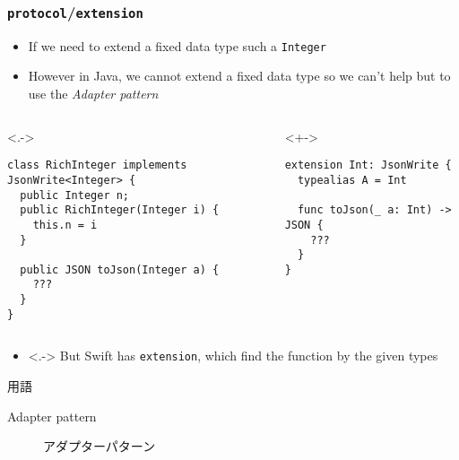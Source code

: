 \begin{frame}[fragile]
  \frametitle{\texttt{protocol}/\texttt{extension}}

  \begin{itemize}
    \item<+-> If we need to extend a fixed data type such a \lstinline|Integer|

    \item<+-> However in Java, we cannot extend a fixed data type so
    we can't help but to use the \emph{Adapter pattern}
  \end{itemize}

  \begin{columns}
    \begin{column}{0.6\textwidth}
      \begin{uncoverenv}<.->
\begin{lstlisting}[style=java, caption={Adapter pattern in Java}]
class RichInteger implements JsonWrite<Integer> {
  public Integer n;
  public RichInteger(Integer i) {
    this.n = i
  }
  
  public JSON toJson(Integer a) {
    ???
  }
}
\end{lstlisting}
      \end{uncoverenv}
    \end{column}
    \begin{column}{0.4\textwidth}
      \begin{uncoverenv}<+->
\begin{lstlisting}[style=swift, caption={\texttt{extension} in Swift}]
extension Int: JsonWrite {
  typealias A = Int

  func toJson(_ a: Int) -> JSON {
    ???
  }
}    
\end{lstlisting}
      \end{uncoverenv}
    \end{column}
  \end{columns}

  \begin{itemize}
    \item<.-> But Swift has \lstinline|extension|,
    which find the function by the given types
  \end{itemize}

  \begin{notes}
    \item 用語
    \begin{description}
      \item[Adapter pattern] アダプターパターン
    \end{description}


\end{notes}
\end{frame}
